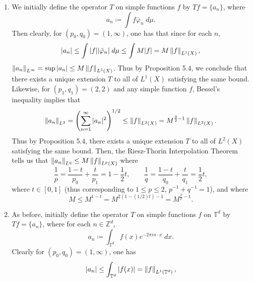\documentclass{article}
\begin{document}
\begin{enumerate}[itemsep =-2pt,label = (\alph{*})]
	\item We initially define the operator $T$ on simple functions $f$ by $Tf = \{a_{n}\}$, where 
	\begin{equation*}
		a_{n} \coloneqq \int f\bar{\varphi}_{n}\;d\mu. 
	\end{equation*}
	Then clearly, for $(p_{0},q_{0})= (1,\infty)$, one has that since for each $n$, 
	\begin{equation*}
		|a_{n}| \leq \int |f||\bar{\varphi}_{n}|\;d\mu \leq \int M|f| = M\left\Vert f \right\Vert_{L^{1}(X)}, 
	\end{equation*}
	$\left\Vert a_{n} \right\Vert_{L^{\infty}} = \sup|a_{n}| \leq M\left\Vert f \right\Vert_{L^{1}(X)}$. Thus by Proposition 5.4, we conclude that there exists a unique extension $T$ to all of $L^{1}(X)$ satisfying the same bound. Likewise, for $(p_{1}, q_{1}) = (2, 2)$ and any simple function $f$, Bessel's inequality implies that 
	\begin{equation*}
		\left\Vert a_{n} \right\Vert_{L^{2}} = \left(\sum_{n = 1}^{\infty}|a_{n}|^{2}\right)^{1/2} \leq \left\Vert f \right\Vert_{L^{2}(X)} = M^{\frac{2}{2} - 1}\left\Vert f \right\Vert_{L^{2}(X)}. 
	\end{equation*}	
	Thus by Proposition 5.4, there exists a unique extension $T$ to all of $L^{2}(X)$ satisfying the same bound. Then, the Riesz-Thorin Interpolation Theorem tells us that $\left\Vert a_{n} \right\Vert_{L^{q}} \leq M \left\Vert f \right\Vert_{L^{p}(X)}$ where 
	\begin{equation*}
		\frac{1}{p} = \frac{1 - t}{p_{0}} + \frac{t}{p_{1}} = 1 - \frac{1}{2}t, \qquad \frac{1}{q} = \frac{1 - t}{q_{0}} + \frac{t}{q_{1}} = \frac{1}{2}t, 
	\end{equation*} 
	where $t \in [0,1]$ (thus corresponding to $1 \leq p \leq 2$, $p^{-1} + q^{-1} = 1$), and where 
	\begin{equation*}
		M \leq M^{1 - t} = M^{2(1 - (1/2)t) - 1} = M^{\frac{2}{p} - 1}. 
	\end{equation*}
	\item As before, initially define the operator $T$ on simple functions $f$ on $\mathbb{T}^{d}$ by $Tf = \{a_{n}\}$, where for each $n \in \mathbb{Z}^{d}$, 
	\begin{equation*}
		a_{n} \coloneqq \int_{\mathbb{T}^{d}}f(x)e^{-2\pi i n \cdot x}\;dx. 
	\end{equation*} 
	Clearly for $(p_{0}, q_{0}) = (1, \infty)$, one has 
	\begin{equation*} 
		|a_{n}| \leq \int_{\mathbb{T}^{d}}|f(x)| = \left\Vert f \right\Vert_{L^{1}(\mathbb{T}^{d})}, 
	\end{equation*} 

\end{enumerate}
\end{document}
